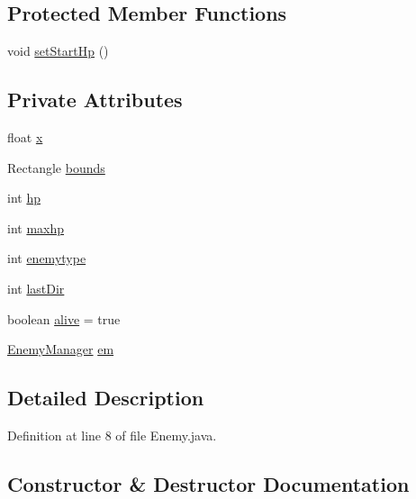 \subsection*{Protected Member Functions}
\begin{DoxyCompactItemize}
\item 
void \hyperlink{classenemies_1_1_enemy_a36ff8539de48d58a670cd19251abe658}{set\+Start\+Hp} ()
\end{DoxyCompactItemize}
\subsection*{Private Attributes}
\begin{DoxyCompactItemize}
\item 
float \hyperlink{classenemies_1_1_enemy_ad0da36b2558901e21e7a30f6c227a45e}{x}
\item 
Rectangle \hyperlink{classenemies_1_1_enemy_a62df0866a4faf552c81108aff64e8eff}{bounds}
\item 
int \hyperlink{classenemies_1_1_enemy_a9aa790f93d2d067a4f5608fdb8409f94}{hp}
\item 
int \hyperlink{classenemies_1_1_enemy_ab00f83dbe0fccddd104bd088c528cd13}{maxhp}
\item 
int \hyperlink{classenemies_1_1_enemy_aac2aa7795cecac1072a281ed3b323443}{enemytype}
\item 
int \hyperlink{classenemies_1_1_enemy_ac435470ac2e2afb54b515dc834ec1591}{last\+Dir}
\item 
boolean \hyperlink{classenemies_1_1_enemy_a14a3219f24517ddf3acada17f436cfd8}{alive} = true
\item 
\hyperlink{classmanagers_1_1_enemy_manager}{Enemy\+Manager} \hyperlink{classenemies_1_1_enemy_ae3966a6508c5a21dafa875aebfee1dfe}{em}
\end{DoxyCompactItemize}


\subsection{Detailed Description}


Definition at line 8 of file Enemy.\+java.



\subsection{Constructor \& Destructor Documentation}
\mbox{\label{classenemies_1_1_enemy_afa298133293bebcdafef5956df1d1911}} 
